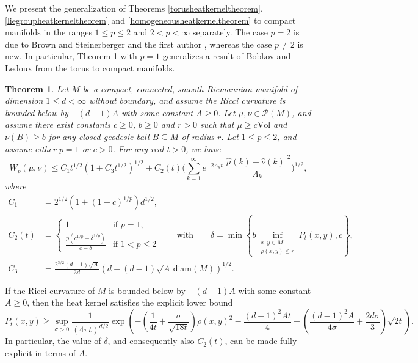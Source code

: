 \documentclass[11pt,a4paper]{article}
\newtheorem{thm}{Theorem}
\theoremstyle{definition}
\begin{document}
We present the generalization of Theorems \ref{torusheatkerneltheorem}, \ref{liegroupheatkerneltheorem} and \ref{homogeneousheatkerneltheorem} to compact manifolds in the ranges $1 \le p \le 2$ and $2<p<\infty$ separately. The case $p=2$ is due to Brown and Steinerberger \cite{BS} and the first author \cite{BOR2}, whereas the case $p \neq 2$ is new. In particular, Theorem \ref{manifoldheatkernelp<2theorem} with $p=1$ generalizes a result of Bobkov and Ledoux \cite{BL1,BL2} from the torus to compact manifolds.
\begin{thm}\label{manifoldheatkernelp<2theorem} Let $M$ be a compact, connected, smooth Riemannian manifold of dimension $1 \le d < \infty$ without boundary, and assume the Ricci curvature is bounded below by $-(d-1)A$ with some constant $A \ge 0$. Let $\mu, \nu \in \mathcal{P}(M)$, and assume there exist constants $c \ge 0$, $b \ge 0$ and $r>0$ such that $\mu \ge c \mathrm{Vol}$ and $\nu (B) \ge b$ for any closed geodesic ball $B \subseteq M$ of radius $r$. Let $1 \le p \le 2$, and assume either $p=1$ or $c>0$. For any real $t>0$, we have
\[ W_p (\mu, \nu) \le C_1 t^{1/2} (1+C_3 t^{1/2})^{1/2} + C_2 (t) \Bigg( \sum_{k=1}^{\infty} e^{- 2 \Lambda_k t} \frac{|\widehat{\mu}(k) - \widehat{\nu}(k)|^2}{\Lambda_k} \Bigg)^{1/2} , \]
where
\[ \begin{split} C_1 &= 2^{1/2} (1+(1-c)^{1/p}) d^{1/2}, \\ C_2(t) &=\left\{ \begin{array}{ll} 1 & \textrm{if } p=1, \\ \frac{p(c^{1/p}-\delta^{1/p})}{c-\delta} & \textrm{if } 1<p \le 2 \end{array} \right. \qquad \textrm{with} \qquad \delta=\min \left\{ b \inf_{\substack{x,y \in M \\ \rho (x,y) \le r}} P_t (x,y) , c \right\} , \\ C_3 &= \frac{2^{3/2}(d-1) \sqrt{A}}{3d} \left( d + (d-1) \sqrt{A} \, \mathrm{diam}(M) \right)^{1/2} . \end{split} \]
\end{thm}

If the Ricci curvature of $M$ is bounded below by $-(d-1)A$ with some constant $A \ge 0$, then the heat kernel satisfies the explicit lower bound \cite[Theorem 3.1]{WA}
\begin{equation}\label{heatkernellowerbound}
P_t (x,y) \ge \sup_{\sigma >0} \frac{1}{(4 \pi t)^{d/2}} \exp \left( - \left( \frac{1}{4t} + \frac{\sigma}{\sqrt{18t}} \right) \rho (x,y)^2 - \frac{(d-1)^2 A t}{4} - \left( \frac{(d-1)^2 A}{4 \sigma} + \frac{2d \sigma}{3} \right) \sqrt{2t} \right) .
\end{equation}
In particular, the value of $\delta$, and consequently also $C_2(t)$, can be made fully explicit in terms of $A$.
\end{document}
